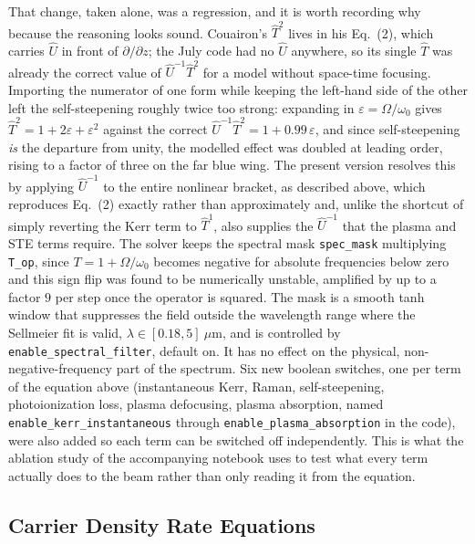 That change, taken alone, was a regression, and it is worth recording why because the reasoning looks sound. Couairon's $\hat{T}^2$ lives in his Eq.~(2), which carries $\hat{U}$ in front of $\partial/\partial z$; the July code had no $\hat{U}$ anywhere, so its single $\hat{T}$ was already the correct value of $\hat{U}^{-1}\hat{T}^2$ for a model without space-time focusing. Importing the numerator of one form while keeping the left-hand side of the other left the self-steepening roughly twice too strong: expanding in $\varepsilon=\Omega/\omega_0$ gives $\hat{T}^2=1+2\varepsilon+\varepsilon^2$ against the correct $\hat{U}^{-1}\hat{T}^2=1+0.99\,\varepsilon$, and since self-steepening \emph{is} the departure from unity, the modelled effect was doubled at leading order, rising to a factor of three on the far blue wing. The present version resolves this by applying $\hat{U}^{-1}$ to the entire nonlinear bracket, as described above, which reproduces Eq.~(2) exactly rather than approximately and, unlike the shortcut of simply reverting the Kerr term to $\hat{T}^1$, also supplies the $\hat{U}^{-1}$ that the plasma and STE terms require. The solver keeps the spectral mask \texttt{spec\_mask} multiplying \texttt{T\_op}, since $T=1+\Omega/\omega_0$ becomes negative for absolute frequencies below zero and this sign flip was found to be numerically unstable, amplified by up to a factor $9$ per step once the operator is squared. The mask is a smooth tanh window that suppresses the field outside the wavelength range where the Sellmeier fit is valid, $\lambda\in[0.18,5]\ \mu\text{m}$, and is controlled by \texttt{enable\_spectral\_filter}, default on. It has no effect on the physical, non-negative-frequency part of the spectrum. Six new boolean switches, one per term of the equation above (instantaneous Kerr, Raman, self-steepening, photoionization loss, plasma defocusing, plasma absorption, named \texttt{enable\_kerr\_instantaneous} through \texttt{enable\_plasma\_absorption} in the code), were also added so each term can be switched off independently. This is what the ablation study of the accompanying notebook uses to test what every term actually does to the beam rather than only reading it from the equation.

\subsection{Carrier Density Rate Equations}
\label{subsec:rate_equations}


